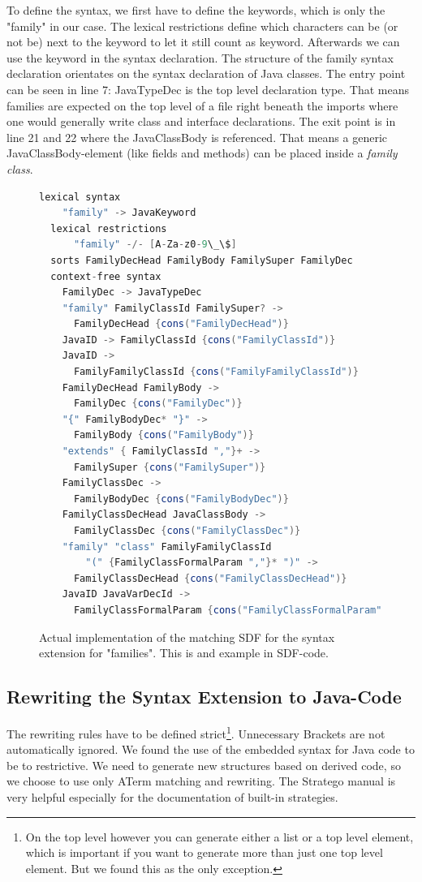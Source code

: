 \documentclass{report}
\begin{document}
To define the syntax, we first have to define the keywords, which is only the "family" in our case. The lexical restrictions define which characters can be (or not be) next to the keyword to let it still count as keyword. Afterwards we can use the keyword in the syntax declaration. The structure of the family syntax declaration orientates on the syntax declaration of Java classes. The entry point can be seen in line 7: JavaTypeDec is the top level declaration type. That means families are expected on the top level of a file right beneath the imports where one would generally write class and interface declarations. The exit point is in line 21 and 22 where the JavaClassBody is referenced. That means a generic JavaClassBody-element (like fields and methods) can be placed inside a \emph{family class}.

\begin{figure}[H]
\begin{lstlisting}[language=java,breaklines=false]
  lexical syntax
    "family" -> JavaKeyword
  lexical restrictions
  	  "family" -/- [A-Za-z0-9\_\$] 
  sorts FamilyDecHead FamilyBody FamilySuper FamilyDec
  context-free syntax
    FamilyDec -> JavaTypeDec
    "family" FamilyClassId FamilySuper? ->
      FamilyDecHead {cons("FamilyDecHead")}
    JavaID -> FamilyClassId {cons("FamilyClassId")}
    JavaID -> 
      FamilyFamilyClassId {cons("FamilyFamilyClassId")}
    FamilyDecHead FamilyBody ->
      FamilyDec {cons("FamilyDec")}
    "{" FamilyBodyDec* "}" ->
      FamilyBody {cons("FamilyBody")}
    "extends" { FamilyClassId ","}+ ->
      FamilySuper {cons("FamilySuper")}
    FamilyClassDec ->
      FamilyBodyDec {cons("FamilyBodyDec")}
    FamilyClassDecHead JavaClassBody ->
      FamilyClassDec {cons("FamilyClassDec")}
    "family" "class" FamilyFamilyClassId
        "(" {FamilyClassFormalParam ","}* ")" ->
      FamilyClassDecHead {cons("FamilyClassDecHead")}
    JavaID JavaVarDecId ->
      FamilyClassFormalParam {cons("FamilyClassFormalParam")}
\end{lstlisting}
\caption{Actual implementation of the matching SDF for the syntax extension for "families". This is and example in SDF-code.}
\label{sdfFamilies}
\end{figure}


\subsection{Rewriting the Syntax Extension to Java-Code}
The rewriting rules have to be defined strict\footnote{On the top level however you can generate either a list or a top level element, which is important if you want to generate more than just one top level element. But we found this as the only exception.}. Unnecessary Brackets are not automatically ignored. We found the use of the embedded syntax for Java code to be to restrictive. We need to generate new structures based on derived code, so we choose to use only ATerm matching and rewriting. The Stratego manual \cite{Stratego-Manual} is very helpful especially for the documentation of built-in strategies.
\end{document}
